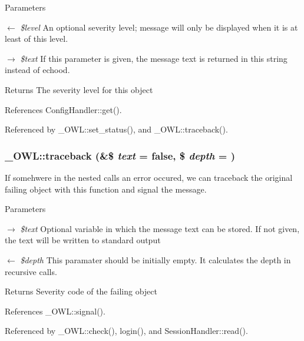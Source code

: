 \begin{DoxyParams}{Parameters}
\item[\mbox{$\leftarrow$} {\em \$level}]An optional severity level; message will only be displayed when it is at least of this level. \item[\mbox{$\rightarrow$} {\em \$text}]If this parameter is given, the message text is returned in this string instead of echood. \end{DoxyParams}
\begin{DoxyReturn}{Returns}
The severity level for this object 
\end{DoxyReturn}


References ConfigHandler::get().



Referenced by \_\-OWL::set\_\-status(), and \_\-OWL::traceback().

\subsubsection[{traceback}]{\setlength{\rightskip}{0pt plus 5cm}\_\-OWL::traceback (\&\$ {\em text} = {\ttfamily false}, \/  \$ {\em depth} = {})}\label{class__OWL_aa29547995d6741b7d2b90c1d4ea99a13}
If somehwere in the nested calls an error occured, we can traceback the original failing object with this function and signal the message.


\begin{DoxyParams}{Parameters}
\item[\mbox{$\rightarrow$} {\em \$text}]Optional variable in which the message text can be stored. If not given, the text will be written to standard output \item[\mbox{$\leftarrow$} {\em \$depth}]This paramater should be initially empty. It calculates the depth in recursive calls. \end{DoxyParams}
\begin{DoxyReturn}{Returns}
Severity code of the failing object 
\end{DoxyReturn}


References \_\-OWL::signal().



Referenced by \_\-OWL::check(), login(), and SessionHandler::read().



